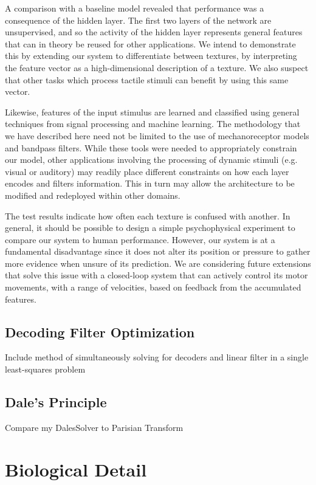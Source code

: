 A comparison with a baseline model revealed that performance was a consequence of the hidden layer. The first two layers of the network are unsupervised, and so the activity of the hidden layer represents general features that can in theory be reused for other applications. We intend to demonstrate this by extending our system to differentiate between textures, by interpreting the feature vector as a high-dimensional description of a texture. We also suspect that other tasks which process tactile stimuli  can benefit by using this same vector.

Likewise, features of the input stimulus are learned and classified using general techniques from signal processing and machine learning. The methodology that we have described here need not be limited to the use of mechanoreceptor models and bandpass filters. While these tools were needed to appropriately constrain our model, other applications involving the processing of dynamic stimuli (e.g. visual or auditory) may readily place different constraints on how each layer encodes and filters information. This in turn may allow the architecture to be modified and redeployed within other domains. 

The test results indicate how often each texture is confused with another. 
In general, it should be possible to design a simple psychophysical experiment to compare our system to human performance. However, our system is at a fundamental disadvantage since it does not  alter its position or pressure to gather more evidence when unsure of its prediction. We are considering future extensions that solve this issue with a closed-loop system that can actively control its motor movements, with a range of velocities,  based on feedback from the accumulated features.

\subsection{Decoding Filter Optimization}

Include method of simultaneously solving for decoders and linear filter in a single least-squares problem

\subsection{Dale's Principle}

Compare my DalesSolver to Parisian Transform


\section{Biological Detail}


